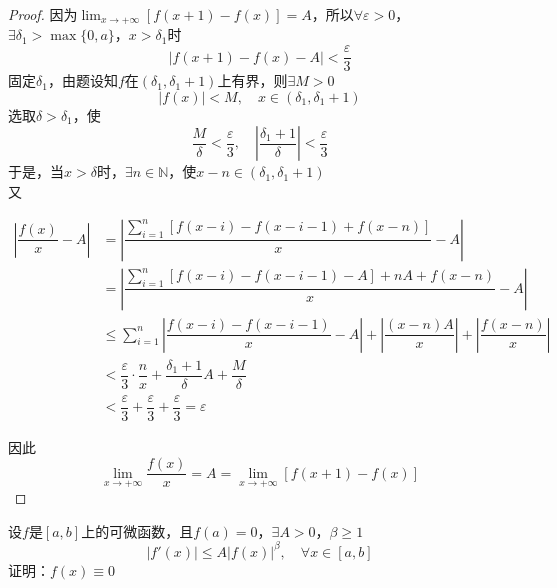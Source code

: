 \begin{proof}

    因为$\lim_{x \to +\infty}{[f(x+1) - f(x)]} = A$，所以$\forall \varepsilon > 0$，$\exists \delta_1 > \max\{0,a\}$，$x > \delta_1$时
    $$|f(x+1) - f(x) - A| < \dfrac{\varepsilon}{3}$$
    固定$\delta_1$，由题设知$f$在$(\delta_1, \delta_1+1)$上有界，则$\exists M > 0$
    $$|f(x)| < M,\quad x \in(\delta_1, \delta_1+1)$$
    选取$\delta > \delta_1$，使
    $$\dfrac{M}{\delta} < \dfrac{\varepsilon}{3}, \quad \left| \dfrac{\delta_1 +1}{\delta} \right| < \dfrac{\varepsilon}{3}$$
    于是，当$x > \delta$时，$\exists n \in \mathbb{N}$，使$x - n \in (\delta_1, \delta_1+1)$\\
    又

    \begin{align*}
        \left| \dfrac{f(x)}{x} - A \right| & = \left| \dfrac{\sum\limits_{i=1}^{n}{[f(x - i) - f(x - i -1) + f(x -n)]}}{x} - A \right| \\
        & = \left| \dfrac{\sum\limits_{i=1}^{n}{[f(x - i) - f(x - i - 1) - A]} + nA + f(x - n)}{x} - A \right| \\
        & \leq \sum_{i = 1}^{n}{\left| \dfrac{f(x -i) - f(x -i -1)}{x} - A \right|} + \left| \dfrac{(x-n)A}{x} \right| + \left| \dfrac{f(x -n)}{x} \right| \\
        & < \dfrac{\varepsilon}{3} \cdot \dfrac{n}{x} + \dfrac{\delta_1 + 1}{\delta} A + \dfrac{M}{\delta} \\
        & < \dfrac{\varepsilon}{3} +\dfrac{\varepsilon}{3} + \dfrac{\varepsilon}{3} = \varepsilon
    \end{align*}

    因此
    $$\lim_{x \to +\infty}{\dfrac{f(x)}{x}} = A =  \lim_{x \to +\infty}{[f(x+1) - f(x)]}$$

\end{proof}

\begin{proposition}

    设$f$是$[a,b]$上的可微函数，且$f(a) = 0$，$\exists A > 0$，$\beta \geq 1$
    $$ |f'(x)| \leq A|f(x)|^{\beta}, \quad \forall x \in [a,b]$$
    证明：$f(x) \equiv 0$

\end{proposition}

